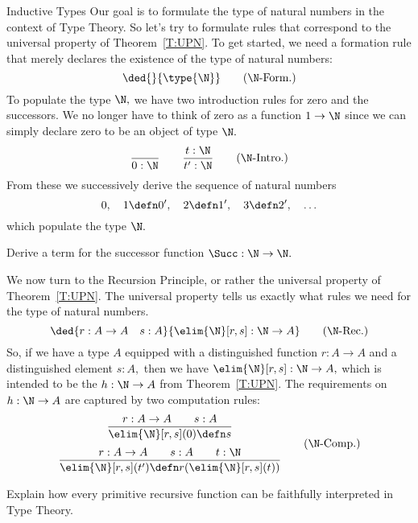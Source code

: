 \begin{unit}{Inductive Types}
Our goal is to formulate the type of natural numbers in the context of Type Theory.
So let's try to formulate rules that correspond to the universal property of Theorem~\ref{T:UPN}.
To get started, we need a formation rule that merely declares the existence of the type of natural numbers:
\[\ded{}{\type{\N}} \tag{$\N$-Form.}\]
To populate the type \(\N,\) we have two introduction rules for zero and the successors.
We no longer have to think of zero as a function \(1 \to \N\) since we can simply declare zero to be an object of type \(\N.\)
\[\frac{}{0 : \N} \qquad \frac{t:\N}{t':\N} \tag{$\N$-Intro.}\]
From these we successively derive the sequence of natural numbers \[0, \quad 1 \defn 0', \quad 2 \defn 1', \quad 3 \defn 2', \quad\ldots\] which populate the type \(\N.\)

\begin{problem}
  Derive a term for the successor function \(\Succ:\N\to\N.\)
\end{problem}

We now turn to the Recursion Principle, or rather the universal property of Theorem~\ref{T:UPN}.
The universal property tells us exactly what rules we need for the type of natural numbers.
\[\ded{r : A \to A \quad s : A}{\elim{\N}[r,s]:\N \to A} \tag{$\N$-Rec.}\]
So, if we have a type \(A\) equipped with a distinguished function \(r: A \to A\) and a distinguished element \(s:A,\) then we have \(\elim{\N}[r,s]:\N \to A,\) which is intended to be the \(h:\N \to A\) from Theorem~\ref{T:UPN}.
The requirements on \(h:\N \to A\) are captured by two computation rules:
\[\begin{gathered}
  \frac{r : A \to A \qquad s : A}{\elim{\N}[r,s](0) \defn s} \\[\jot]
  \frac{r : A \to A \qquad s : A \qquad t : \N}{\elim{\N}[r,s](t') \defn r(\elim{\N}[r,s](t))}
\end{gathered}\tag{$\N$-Comp.}\]

\begin{problem}
  Explain how every primitive recursive function can be faithfully interpreted in Type Theory. 
\end{problem}


\end{unit}

